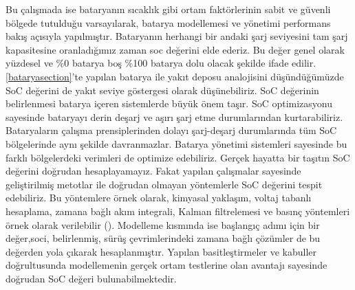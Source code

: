 Bu çalışmada ise bataryanın sıcaklık gibi ortam faktörlerinin sabit ve güvenli bölgede tutulduğu varsayılarak, batarya modellemesi ve yönetimi performans bakış açısıyla yapılmıştır.
Bataryanın herhangi bir andaki şarj seviyesini tam şarj kapasitesine oranladığımız zaman \acrfull{soc} değerini elde ederiz. Bu değer genel olarak yüzdesel ve \%0 batarya boş \%100 batarya dolu olacak şekilde ifade edilir. \ref{bataryasection}'te yapılan batarya ile yakıt deposu analojisini düşündüğümüzde SoC değerini de yakıt seviye göstergesi olarak düşünebiliriz. SoC değerinin belirlenmesi batarya içeren sistemlerde büyük önem taşır. SoC optimizasyonu sayesinde bataryayı 
derin deşarj ve aşırı şarj etme durumlarından kurtarabiliriz. Bataryaların çalışma prensiplerinden dolayı şarj-deşarj durumlarında tüm SoC bölgelerinde aynı şekilde davranmazlar. Batarya yönetimi sistemleri sayesinde bu farklı bölgelerdeki verimleri de optimize edebiliriz.
Gerçek hayatta bir taşıtın SoC değerini doğrudan hesaplayamayız. Fakat yapılan çalışmalar sayesinde geliştirilmiş metotlar ile doğrudan olmayan yöntemlerle SoC değerini tespit edebiliriz. Bu yöntemlere örnek olarak, kimyasal yaklaşım, voltaj tabanlı hesaplama, zamana bağlı akım integrali, Kalman filtrelemesi ve basınç yöntemleri örnek olarak verilebilir (\cite{socdegerinibulma}). 
Modelleme kısmında ise başlangıç adımı için bir değer,\acrfull{soci}, belirlenmiş, sürüş çevrimlerindeki zamana bağlı çözümler de bu değerden yola çıkarak hesaplanmıştır. Yapılan 
basitleştirmeler ve kabuller doğrultusunda modellemenin gerçek ortam testlerine olan avantajı sayesinde doğrudan SoC değeri bulunabilmektedir.

